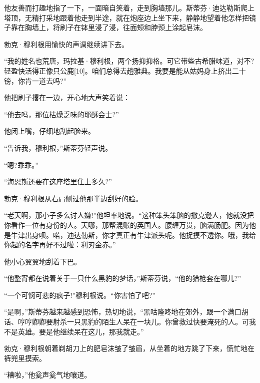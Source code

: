\documentclass{article}
\begin{document}
他友善而打趣地指了一下，一面暗自笑着，走到胸墙那儿。斯蒂芬·迪达勒斯爬上塔顶，无精打采地跟着他走到半途，就在炮座边上坐下来，静静地望着他怎样把镜子靠在胸墙上，将刷子在钵里浸了浸，往面颊和脖颈上涂起皂沫。



勃克·穆利根用愉快的声调继续讲下去。



“我的姓名也荒唐，玛拉基·穆利根，两个扬抑抑格。可它带些古希腊味道，对不?轻盈快活得正像只公鹿[10]。咱们总得去趟雅典。我要是能从姑妈身上挤出二十镑，你肯一道去吗?”



他把刷子撂在一边，开心地大声笑着说：



“他去吗，那位枯燥乏味的耶酥会士?”



他闭上嘴，仔细地刮起脸来。



“告诉我，穆利根，”斯蒂芬轻声说。



“嗯?乖乖。”



“海恩斯还要在这座塔里住上多久?”



勃克·穆利根从右肩侧过他那半边刮好的脸。



“老天啊，那小子多么讨人嫌!”他坦率地说。“这种笨头笨脑的撒克逊人，他就没把你看作一位有身份的人。天哪，那帮混账的英国人。腰缠万贯，脑满肠肥。因为他是牛津出身呗。喏，迪达勒斯，你才真正有牛津派头呢。他捉摸不透你。哦，我给你起的名字再好不过啦：利刃金赤。”



他小心翼翼地刮着下巴。



“他整宵都在说着关于一只什么黑豹的梦话，”斯蒂芬说，“他的猎枪套在哪儿?”



“一个可悯可悲的疯子!”穆利根说。“你害怕了吧?”



“是啊，”斯蒂芬越来越感到恐怖，热切地说，“黑咕隆咚地在郊外，跟一个满口胡话、哼哼卿卿要射杀一只黑豹的陌生人呆在一块儿。你曾救过快要淹死的人。可我不是英雄。要是他继续呆在这儿，那我就走。”



勃克·穆利根朝着剃胡刀上的肥皂沫皱了皱眉，从坐着的地方跳了下来，慌忙地在裤兜里摸索。



“糟啦，”他瓮声瓮气地嚷道。
\end{document}
